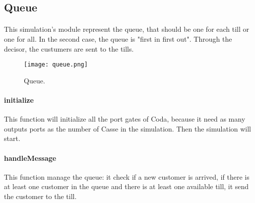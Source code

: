 \subsection{Queue}
\paragraph{} This simulation's module represent the queue, that should be one for each till or one for all. In the second case, the queue is "first in first out". Through the decisor, the custumers are sent to the tills. 
\begin{figure}[h]
  \begin{center}
  \texttt{[image: queue.png]}
  \caption{Queue.}
  \label{fig:que}
  \end{center}
\end{figure}

\paragraph{initialize} This function will initialize all the port gates of Coda, because it need as many outputs ports as the number of Casse in the simulation. Then the simulation will start.

\paragraph{handleMessage} This function manage the queue: it check if a new customer is arrived, if there is at least one customer in the queue and there is at least one available till, it send the customer to the till.
